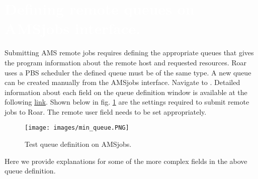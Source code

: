 \section{
    \textcolor{white}{
        Defining remote queues on AMSjobs interface.
    }
    \label{sec3:defq}
}
Submitting AMS remote jobs requires defining the appropriate queues that gives the program information about the remote host and requested resources. 
Roar uses a PBS scheduler the defined queue must be of the same type. 
A new queue can be created manually from the AMSjobs interface. 
Navigate to . 
Detailed information about each field on the queue definition window is available at the following \href{https://www.scm.com/doc/GUI/AMSjobs.html?highlight=pbs#setting-up-your-own-queues}{link}. 
Shown below in fig. \ref{fig:min_queue} are the settings required to submit remote jobs to Roar. 
The remote user field needs to be set appropriately.  
\begin{figure}[H]
    \texttt{[image: images/min\_queue.PNG]}
    \caption{Test queue definition on AMSjobs.
        \label{fig:min_queue}
    }
\end{figure}
Here we provide explanations for some of the more complex fields in the above queue definition. 
